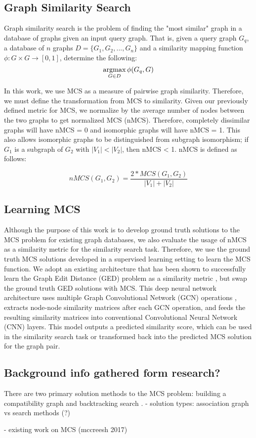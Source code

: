 \subsection{Graph Similarity Search}
Graph similarity search is the problem of finding the "most similar" graph in a database of graphs given an input query graph. That is, given a query graph $G_q$, a database of $n$ graphs $D = \{G_1, G_2, ..., G_n\}$ and a similarity mapping function $\phi: G \times G \rightarrow [0, 1]$, determine the following:
$$ \displaystyle \mathop{\mathop{\mathrm{argmax}}}_{G \in D}  \phi(G_q, G)$$

In this work, we use MCS as a measure of pairwise graph similarity. Therefore, we must define the transformation from MCS to similarity. Given our previously defined metric for MCS, we normalize by the average number of nodes between the two graphs to get normalized MCS (nMCS). Therefore, completely dissimilar graphs will have nMCS = 0 and isomorphic graphs will have nMCS = 1. This also allows isomorphic graphs to be distinguished from subgraph isomorphism; if $G_1$ is a subgraph of $G_2$ with $|V_1| < |V_2|$, then nMCS < 1. nMCS is defined as follows:

$$ nMCS(G_1, G_2) = \frac{2 * MCS(G_1, G_2)}{|V_1| + |V_2|} $$



\subsection{Learning MCS}
Although the purpose of this work is to develop ground truth solutions to the MCS problem for existing graph databases, we also evaluate the usage of nMCS as a similarity metric for the similarity search task. Therefore, we use the ground truth MCS solutions developed in a supervised learning setting to learn the MCS function. We adopt an existing architecture that has been shown to successfully learn the Graph Edit Distance (GED) problem as a similarity metric \cite{bai2018convolutional}, but swap the ground truth GED solutions with MCS. This deep neural network architecture uses multiple Graph Convolutional Network (GCN) operations \cite{kipf2016semi}, extracts node-node similarity matrices after each GCN operation, and feeds the resulting similarity matrices into conventional Convolutional Neural Network (CNN) layers. This model outputs a predicted similarity score, which can be used in the similarity search task or transformed back into the predicted MCS solution for the graph pair.

\subsection{Background info gathered form research?}
There are two primary solution methods to the MCS problem: building a compatibility graph  and backtracking search . 
- solution types: association graph vs search methods (?)


- existing work on MCS (mccreesh 2017)
